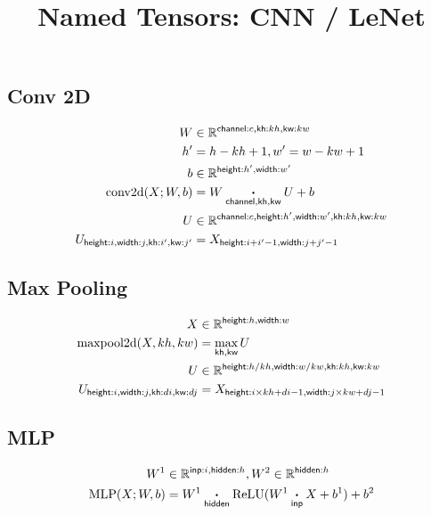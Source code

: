 \documentclass{article}
\title{Named Tensors: CNN / LeNet}
\date{}
\newcommand{\reals}[0]{\mathbb{R}}
\begin{document}
\maketitle


\subsection*{Conv 2D}

\begin{align*} 
W &\in \reals^{\nset{channel}{c},\nset{kh}{kh}, \nset{kw}{kw}} \\
h' &= h-kh +1, w' = w-kw +1 \\
b &\in \reals^{\nset{height}{h'}, \nset{width}{w'}}  \\
\text{conv2d}(X; W, b) &=  W \ndot{channel, kh, kw} U + b \\
U &\in \reals^{{\nset{channel}{c}, \nset{height}{h'},
\nset{width}{w'}, \nset{kh}{kh}, \nset{kw}{kw}}}  \\
U_{\nidx{height}{i}, \nidx{width}{j}, \nidx{kh}{i'}, \nidx{kw}{j'}} &= X_{\nidx{height}{i+i' - 1}, \nidx{width}{j+j' - 1}}  
\end{align*}

\subsection*{Max Pooling}

\begin{align*} 
X &\in \reals^{\nset{height}{h}, \nset{width}{w}} \\
\text{maxpool2d}(X, kh, kw) &=  \nfun{kh, kw}{max}  U \\
U &\in \reals^{{\nset{height}{h / kh},
\nset{width}{w / kw}, \nset{kh}{kh}, \nset{kw}{kw}}}  \\
U_{\nidx{height}{i}, \nidx{width}{j}, \nidx{kh}{di}, \nidx{kw}{dj}} & = X_{\nidx{height}{i \times kh + di -1}, \nidx{width}{j \times kw + dj - 1}}  
\end{align*}

\subsection*{MLP}

\begin{align*} 
W^1 &\in \reals^{\nset{inp}{i}, \nset{hidden}{h}}, 
W^2 \in \reals^{ \nset{hidden}{h}} \\
\text{MLP}(X; W, b) &=  W^1 \ndot{hidden} \text{ReLU}(W^1 \ndot{inp} X + b^1) + b^2 
\end{align*}
\end{document}
